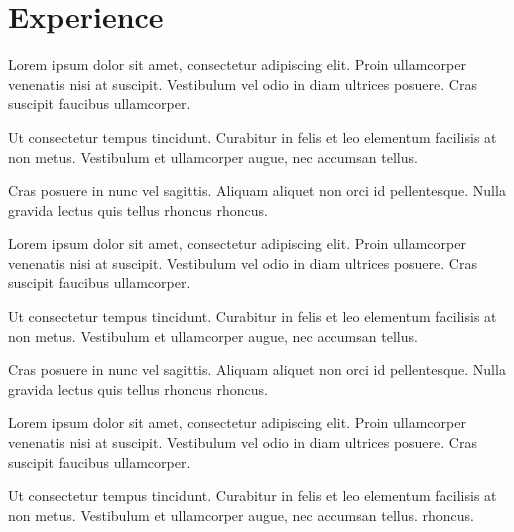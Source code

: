 \documentclass[]{CV}
\begin{document}
\begin{minipage}[t]{0.70\textwidth} 



\section{Experience}
\vspace{\topsep} %
\begin{tightemize}
\sectionsep
\item Lorem ipsum dolor sit amet, consectetur adipiscing elit. Proin ullamcorper venenatis nisi at suscipit. Vestibulum vel odio in diam ultrices posuere. Cras suscipit faucibus ullamcorper.
\item Ut consectetur tempus tincidunt. Curabitur in felis et leo elementum facilisis at non metus. Vestibulum et ullamcorper augue, nec accumsan tellus. \item Cras posuere in nunc vel sagittis. Aliquam aliquet non orci id pellentesque. Nulla gravida lectus quis tellus rhoncus rhoncus.  
\end{tightemize}
\sectionsep

\begin{tightemize}
\sectionsep
\item Lorem ipsum dolor sit amet, consectetur adipiscing elit. Proin ullamcorper venenatis nisi at suscipit. Vestibulum vel odio in diam ultrices posuere. Cras suscipit faucibus ullamcorper.
\item Ut consectetur tempus tincidunt. Curabitur in felis et leo elementum facilisis at non metus. Vestibulum et ullamcorper augue, nec accumsan tellus.
\item Cras posuere in nunc vel sagittis. Aliquam aliquet non orci id pellentesque. Nulla gravida lectus quis tellus rhoncus rhoncus.
\end{tightemize}
\sectionsep

\begin{tightemize}
\sectionsep
\item Lorem ipsum dolor sit amet, consectetur adipiscing elit. Proin ullamcorper venenatis nisi at suscipit. Vestibulum vel odio in diam ultrices posuere. Cras suscipit faucibus ullamcorper.
\item Ut consectetur tempus tincidunt. Curabitur in felis et leo elementum facilisis at non metus. Vestibulum et ullamcorper augue, nec accumsan tellus.
 rhoncus.
\end{tightemize}
\sectionsep



\end{minipage}
\end{document}
